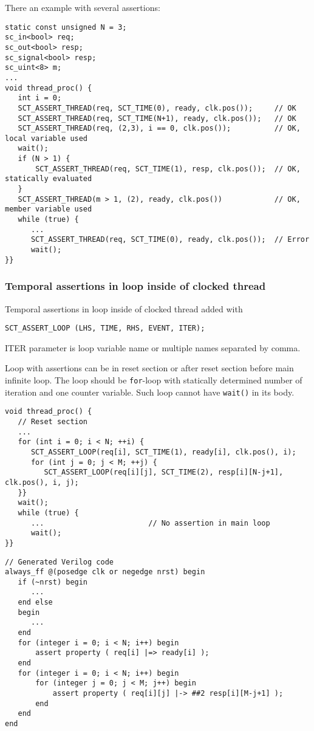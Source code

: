 There an example with several assertions:

\begin{lstlisting}[style=mycpp]
static const unsigned N = 3;
sc_in<bool> req;
sc_out<bool> resp;
sc_signal<bool> resp;
sc_uint<8> m;
...
void thread_proc() {
   int i = 0;
   SCT_ASSERT_THREAD(req, SCT_TIME(0), ready, clk.pos());     // OK
   SCT_ASSERT_THREAD(req, SCT_TIME(N+1), ready, clk.pos());   // OK 
   SCT_ASSERT_THREAD(req, (2,3), i == 0, clk.pos());          // OK, local variable used
   wait();
   if (N > 1) {
       SCT_ASSERT_THREAD(req, SCT_TIME(1), resp, clk.pos());  // OK, statically evaluated
   }
   SCT_ASSERT_THREAD(m > 1, (2), ready, clk.pos())            // OK, member variable used
   while (true) {   
      ...
      SCT_ASSERT_THREAD(req, SCT_TIME(0), ready, clk.pos());  // Error
      wait();
}}
\end{lstlisting}

\subsubsection{Temporal assertions in loop inside of clocked thread}

Temporal assertions in loop inside of clocked thread added with 
\begin{lstlisting}[style=mycpp]
SCT_ASSERT_LOOP (LHS, TIME, RHS, EVENT, ITER);
\end{lstlisting}
%
ITER parameter is loop variable name or multiple names separated by comma.

Loop with assertions can be in reset section or after reset section before main infinite loop. The loop should be {\tt for}-loop with statically determined number of iteration and one counter variable. Such loop cannot have {\tt wait()} in its body. 

\begin{lstlisting}[style=mycpp]
void thread_proc() {
   // Reset section
   ...
   for (int i = 0; i < N; ++i) {
      SCT_ASSERT_LOOP(req[i], SCT_TIME(1), ready[i], clk.pos(), i);
      for (int j = 0; j < M; ++j) {
         SCT_ASSERT_LOOP(req[i][j], SCT_TIME(2), resp[i][N-j+1], clk.pos(), i, j);
   }}
   wait();                        
   while (true) { 
      ...                        // No assertion in main loop 
      wait();
}}
\end{lstlisting}
%
\begin{lstlisting}[style=myverilog]
// Generated Verilog code
always_ff @(posedge clk or negedge nrst) begin
   if (~nrst) begin
      ...
   end else 
   begin 
      ... 
   end 
   for (integer i = 0; i < N; i++) begin
       assert property ( req[i] |=> ready[i] );  
   end 
   for (integer i = 0; i < N; i++) begin
       for (integer j = 0; j < M; j++) begin
           assert property ( req[i][j] |-> ##2 resp[i][M-j+1] );  
       end
   end 
end
\end{lstlisting}

